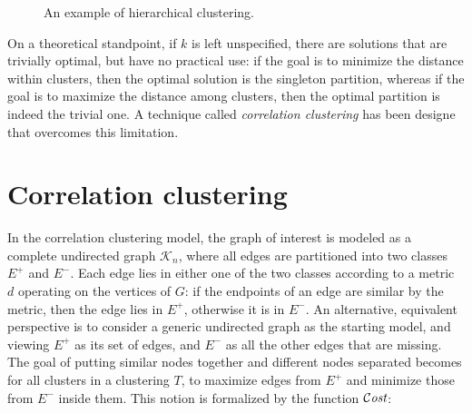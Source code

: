 \begin{figure}[ht]
    \caption{An example of hierarchical clustering.}
    \label{fig:hierarchical-clustering-ex}
\end{figure}

On a theoretical standpoint, if $k$ is left unspecified, there are solutions that are trivially optimal, but have no practical use: if the goal is to minimize the distance within clusters, then the optimal solution is the singleton partition, whereas if the goal is to maximize the distance among clusters, then the optimal partition is indeed the trivial one. A technique called \textit{correlation clustering} has been designe that overcomes this limitation.


\section{Correlation clustering}\label{sec:corr-clust}

In the correlation clustering model, the graph of interest is modeled as a complete undirected graph $\mathcal{K}_n$, where all edges are partitioned into two classes $E^+$ and $E^-$. Each edge lies in either one of the two classes according to a metric $d$ operating on the vertices of $G$: if the endpoints of an edge are similar by the metric, then the edge lies in $E^+$, otherwise it is in $E^-$. An alternative, equivalent perspective is to consider a generic undirected graph as the starting model, and viewing $E^+$ as its set of edges, and $E^-$ as all the other edges that are missing.
The goal of putting similar nodes together and different nodes separated becomes for all clusters in a clustering $T$, to maximize edges from $E^+$ and minimize those from $E^-$ inside them. This notion is formalized by the function $\mathcal{C}\textit{ost}$:

